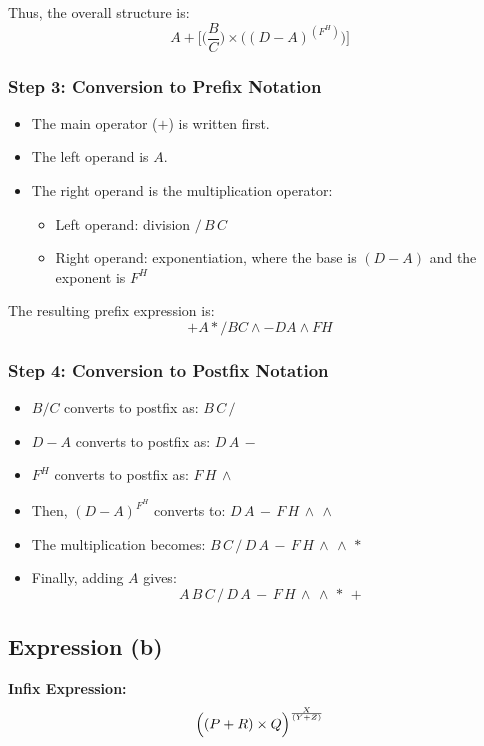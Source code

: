 \documentclass[12pt]{article}
\begin{document}
Thus, the overall structure is:
\[
    A + \biggl[ \bigl(\frac{B}{C}\bigr) \times \bigl((D-A)^{(F^{H})}\bigr) \biggr]
\]

\subsubsection*{Step 3: Conversion to Prefix Notation}
\begin{itemize}[label=$\bullet$]
    \item The main operator ($+$) is written first.
    \item The left operand is $A$.
    \item The right operand is the multiplication operator:
          \begin{itemize}[label=$\circ$]
              \item Left operand: division $/\,B\,C$
              \item Right operand: exponentiation, where the base is $(D-A)$ and the exponent is $F^H$ 
          \end{itemize}
\end{itemize}

The resulting prefix expression is:
\[
    + A * / B C \wedge - D A \wedge F H
\]

\subsubsection*{Step 4: Conversion to Postfix Notation}
\begin{itemize}[label=$\bullet$]
    \item $B/C$ converts to postfix as: $B\,C\,/$
    \item $D-A$ converts to postfix as: $D\,A\,-$
    \item $F^H$ converts to postfix as: $F\,H\,\wedge$
    \item Then, $(D-A)^{F^H}$ converts to: $D\,A\,-\,F\,H\,\wedge\,\wedge$
    \item The multiplication becomes: $B\,C\,/\,D\,A\,-\,F\,H\,\wedge\,\wedge\,*$
    \item Finally, adding $A$ gives:
          \[
              A\,B\,C\,/\,D\,A\,-\,F\,H\,\wedge\,\wedge\,*\,+
          \]
\end{itemize}

\newpage
\subsection*{Expression (b)}
\textbf{Infix Expression:}
\[
    \Bigl((P+R) \times Q\Bigr)^{\frac{X}{(Y+Z)}}
\]
\end{document}
